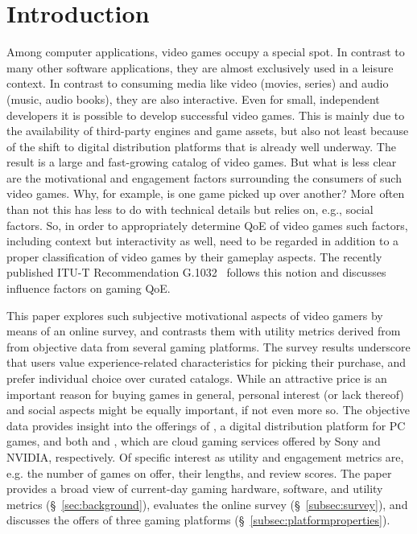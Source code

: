 
\section{Introduction}

Among computer applications, video games occupy a special spot.
In contrast to many other software applications, they are almost
exclusively used in a leisure context.
In contrast to consuming media like video (movies, series) and
audio (music, audio books), they are also interactive.
Even for small, independent developers it is possible to develop successful video games. This is mainly due to the availability of third-party engines and game assets, but also not least because of the shift to digital distribution platforms that is already well underway. The result is a large and fast-growing catalog of video games.
But what is less clear are the motivational and engagement factors surrounding the consumers of such video games. Why, for example, is one game picked up over another? More often than not this has less to do with technical details but relies on, e.g., social factors.
So, in order to appropriately determine \gls{QoE} of video games such factors, including context but interactivity as well, need to be regarded in addition to a proper classification of video games by their gameplay aspects.
The recently published \acrshort{ITU-T} Recommendation
G.1032~\cite{itutg1032} follows this notion and discusses influence
factors on gaming \gls{QoE}.

This paper explores such subjective motivational aspects of video gamers
by means of an online survey, and contrasts them with utility
metrics derived from from objective data from several gaming platforms.
The survey results underscore that users value experience-related
characteristics for picking their purchase, and prefer individual choice
over curated catalogs. While an attractive price is an important
reason for buying games in general, personal interest (or lack thereof) and social aspects might be equally important, if not even more so.
The objective data provides insight into the offerings of \steam, a digital distribution platform for PC games, and both \psnow and \gfnow, which are cloud gaming services offered by Sony and NVIDIA, respectively.
Of specific interest as utility and engagement metrics are, e.g. the number
of games on offer, their lengths, and review scores.
The paper provides a broad view of current-day gaming hardware,
software, and utility metrics (\S~\ref{sec:background}),
evaluates the online survey (\S~\ref{subsec:survey}), and
discusses the offers of three gaming platforms
(\S~\ref{subsec:platformproperties}).
